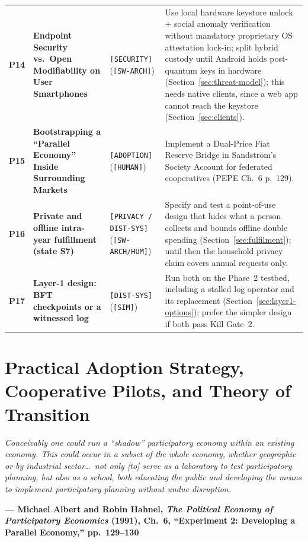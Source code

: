 \documentclass[10pt,twoside,openany]{book}
\theoremstyle{dpepstyle}
\newcommand{\chapterepigraph}[2]{%
  \vspace{-0.4em}
  \begin{FlushRight}
  \begin{minipage}{0.82\textwidth}
    \itshape\small\color{SlateDark} #1\par
    \vspace{3pt}
    \upshape\footnotesize\textbf{--- #2}
  \end{minipage}
  \end{FlushRight}
  \vspace{1em}
}
\newenvironment{FlushRight}{\begin{flushright}}{\end{flushright}}
\begin{document}
{\begin{longtable}{C{0.28in} L{1.50in} L{0.72in} L{1.90in}}
\addlinespace[3pt]
\textbf{P14} & \textbf{Endpoint Security vs.\ Open Modifiability on User Smartphones} & \texttt{[SECURITY]} (\texttt{[SW-ARCH]}) & Use local hardware keystore unlock + social anomaly verification without mandatory proprietary OS attestation lock-in; split hybrid custody until Android holds post-quantum keys in hardware (Section~\ref{sec:threat-model}); this needs native clients, since a web app cannot reach the keystore (Section~\ref{sec:clients}). \\*
\addlinespace[3pt]
\textbf{P15} & \textbf{Bootstrapping a ``Parallel Economy'' Inside Surrounding Markets} & \texttt{[ADOPTION]} (\texttt{[HUMAN]}) & Implement a Dual-Price Fiat Reserve Bridge in Sandstr\"om's Society Account for federated cooperatives (PEPE Ch.~6 p.~129). \\
\addlinespace[3pt]
\textbf{P16} & \textbf{Private and offline intra-year fulfillment (state S7)} & \texttt{[PRIVACY / DIST-SYS]} (\texttt{[SW-ARCH/HUM]}) & Specify and test a point-of-use design that hides what a person collects and bounds offline double spending (Section~\ref{sec:fulfilment}); until then the household privacy claim covers annual requests only. \\
\addlinespace[3pt]
\textbf{P17} & \textbf{Layer-1 design: BFT checkpoints or a witnessed log} & \texttt{[DIST-SYS]} (\texttt{[SIM]}) & Run both on the Phase~2 testbed, including a stalled log operator and its replacement (Section~\ref{sec:layer1-options}); prefer the simpler design if both pass Kill Gate~2. \\
\end{longtable}}

\chapter{Practical Adoption Strategy, Cooperative Pilots, and Theory of Transition}
\label{ch:adoption}

\chapterepigraph{Conceivably one could run a ``shadow'' participatory economy within an existing economy. This could occur in a subset of the whole economy, whether geographic or by industrial sector\dots\ not only [to] serve as a laboratory to test participatory planning, but also as a school, both educating the public and developing the means to implement participatory planning without undue disruption.}{Michael Albert and Robin Hahnel, \emph{The Political Economy of Participatory Economics} (1991), Ch.~6, ``Experiment 2: Developing a Parallel Economy,'' pp.~129--130\protect\footnotemark}
\end{document}
